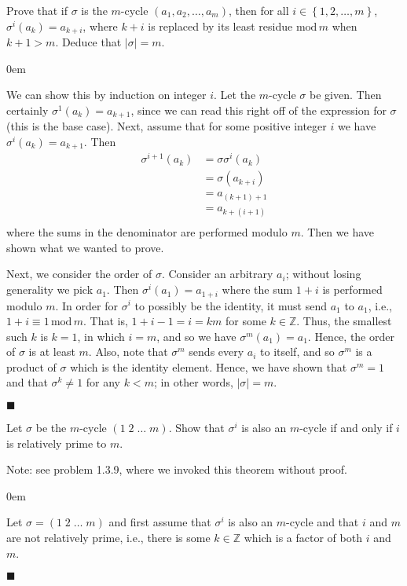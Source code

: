 \documentclass[12pt]{article}
\renewcommand{\qed}{\hfill$\blacksquare$}
\renewenvironment{proof}{\begin{addmargin}[1em]{0em}\begin{newproof}}{\end{newproof}\end{addmargin}\qed}
\newenvironment{problem}[2][Exercise]{\begin{trivlist}
\item[\hskip \labelsep {\bfseries #1}\hskip \labelsep {\bfseries #2.}]}{\end{trivlist}}
\begin{document}
\begin{problem}{1.3.10}
Prove that if $\sigma$ is the $m$-cycle $\left(a_1,a_2,\ldots,a_m\right)$, then for all $i\in \left\{1,2,\ldots,m\right\}$, $\sigma^i\left(a_k\right)=a_{k+i}$, where $k+i$ is replaced by its least residue $\text{mod}\, m$ when $k+1 > m$. Deduce that $\left|\sigma\right|=m$.
\end{problem}
\begin{proof}
We can show this by induction on integer $i$. Let the $m$-cycle $\sigma$ be given. Then certainly $\sigma^1\left(a_k\right) = a_{k+1}$, since we can read this right off of the expression for $\sigma$ (this is the base case). Next, assume that for some positive integer $i$ we have $\sigma^i\left(a_k\right)=a_{k+1}$. Then
\begin{equation*}
    \begin{split}
        \sigma^{i+1}\left(a_k\right) & = \sigma \sigma^i \left(a_k\right) \\
        & = \sigma\left(a_{k+i}\right) \\
        & = a_{\left(k+1\right)+1} \\
        & = a_{k+\left(i+1\right)} \\
    \end{split}
\end{equation*}
where the sums in the denominator are performed modulo $m$. Then we have shown what we wanted to prove.

Next, we consider the order of $\sigma$. Consider an arbitrary $a_i$; without losing generality we pick $a_1$. Then $\sigma^{i}\left(a_1\right) = a_{1+i}$ where the sum $1+i$ is performed modulo $m$. In order for $\sigma^i$ to possibly be the identity, it must send $a_1$ to $a_1$, i.e., $1+i \equiv 1 \, \text{mod}\, m$. That is, $1+i-1 = i = km $ for some $k\in \mathbb{Z}$. Thus, the smallest such $k$ is $k=1$, in which $i=m$, and so we have $\sigma^m\left(a_1\right)=a_1$. Hence, the order of $\sigma$ is at least $m$. Also, note that $\sigma^m$ sends every $a_i$ to itself, and so $\sigma^m$ is a product of $\sigma$ which is the identity element. Hence, we have shown that $\sigma^m = 1$ and that $\sigma^k \neq 1$ for any $k<m$; in other words, $\left|\sigma\right|=m$.
\end{proof}




\begin{problem}{1.3.11}
Let $\sigma$ be the $m$-cycle $\left(1\;2\;\ldots \; m\right)$. Show that $\sigma^i$ is also an $m$-cycle if and only if $i$ is relatively prime to $m$.
\end{problem}
Note: see problem 1.3.9, where we invoked this theorem without proof.\\
\begin{proof}
Let $\sigma = \left(1\;2\;\ldots \;m\right)$ and first assume that $\sigma^i$ is also an $m$-cycle and that $i$ and $m$ are not relatively prime, i.e., there is some $k\in \mathbb{Z}$ which is a factor of both $i$ and $m$.
\end{proof}
\end{document}
